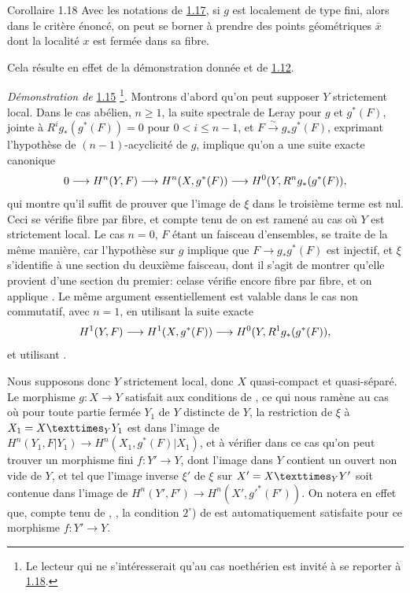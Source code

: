\documentclass[10pt]{../fichiers-configuration-latex/smfart}
\begin{document}
\begin{enonce*}{Corollaire 1.18}
Avec les notations de \hyperref[XV.cor1.17]{1.17}, si $g$ est localement de type fini,
alors dans le critère énoncé, on peut se borner à prendre des points
géométriques $\bar{x}$ dont la localité $x$ est fermée dans sa fibre.
\end{enonce*}

Cela résulte en effet de la démonstration donnée et de \hyperref[XV.cor1.12]{1.12}.

\noindent
\emph{Démonstration de} \hyperref[XV.thm1.15]{1.15} \footnote[1]{Le lecteur qui ne
s'intéresserait qu'au cas noethérien est invité à se reporter à
\hyperref[XV.rem1.18]{1.18}.}.
Montrons d'abord qu'on peut supposer $Y$ strictement
local. Dans le cas abélien, $n\geq 1$, la suite spectrale de Leray
pour $g$ et $g^{\ast}(F)$, jointe à $R^{i}g_{\ast}(g^{\ast}(F))=0$
pour $0<i\leq n-1$, et $F\xrightarrow{\sim}g_{\ast}g^{\ast}(F)$,
exprimant l'hypothèse de $(n-1)$-acyclicité de $g$, implique qu'on a
une suite exacte canonique
$$
0\longrightarrow H^{n}(Y,F)\longrightarrow
H^{n}(X,g^{\ast}(F))\longrightarrow
H^{0}(Y,R^{n}g_{\ast}(g^{\ast}(F)){},
$$
qui montre qu'il suffit de prouver que l'image de $\xi$ dans le
troisième terme est nul. Ceci se vérifie fibre par fibre, et compte
tenu de  on est ramené au cas où $Y$ est strictement local.
Le cas $n=0$, $F$ étant un faisceau d'ensembles, se traite de la même
manière, car l'hypothèse sur $g$ implique que $F\rightarrow
g_{\ast}g^{\ast}(F)$ est injectif, et $\xi$ s'identifie à une section
du deuxième faisceau, dont il s'agit de montrer qu'elle provient d'une
section du premier: cela\pageoriginale se vérifie encore fibre par
fibre, et on applique .
Le même argument essentiellement est
valable dans le cas non commutatif, avec $n=1$, en utilisant la suite
exacte 
$$
H^{1}(Y,F)\longrightarrow H^{1}(X,g^{\ast}(F))\longrightarrow
H^{0}(Y,R^{1}g_{\ast}(g^{\ast}(F)){},
$$
et utilisant .

Nous supposons donc $Y$ strictement local, donc $X$ quasi-compact et
quasi-séparé. Le morphisme $g:X\rightarrow Y$ satisfait aux conditions
de , ce qui nous ramène au cas où pour toute partie fermée
$Y_{1}$ de $Y$ distincte de $Y$, la restriction de $\xi$ à
$X_{1}=\fprod{X}{Y_1}{Y}$ est dans l'image de
$H^{n}(Y_1,F|Y_1)\rightarrow H^{n}(X_1,g^{\ast}(F)|X_1)$, et à
vérifier dans ce cas qu'on peut trouver un morphisme fini $f:Y' \rightarrow Y$,
dont l'image dans $Y$ contient un ouvert non vide de $Y$, et tel que
l'image inverse $\xi'$ de $\xi$ sur $X'=\fprod{X}{Y'}{Y}$ soit
contenue dans l'image de $H^{n}(Y',F')\rightarrow
H^{n}(X',{g'}^{\ast}(F'))$. On notera en effet que, compte tenu de
, , la condition $2^{\circ}$) de \loccit est
automatiquement satisfaite pour ce morphisme $f:Y'\rightarrow Y$.
\end{document}
